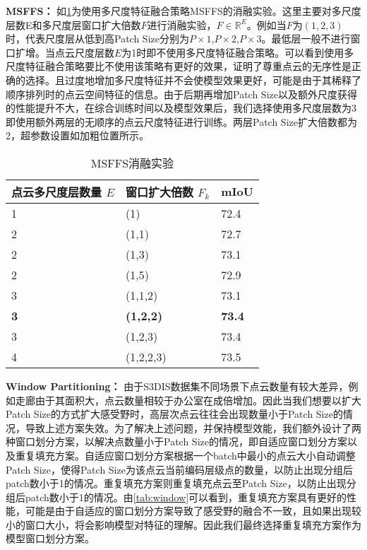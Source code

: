 \documentclass[preprint,12pt]{elsarticle}
\begin{document}
\textbf{MSFFS：}
如\cref{tab:MSFFS}为使用多尺度特征融合策略MSFFS的消融实验。这里主要对多尺度层数E和多尺度层窗口扩大倍数$F$进行消融实验，$F\in \mathbb{R}^{E}$。例如当$F$为$(1,2,3)$时，代表尺度层从低到高Patch Size分别为$P\times 1$,$P\times 2$,$P\times 3$。最低层一般不进行窗口扩增。当点云尺度层数$E$为1时即不使用多尺度特征融合策略。可以看到使用多尺度特征融合策略要比不使用该策略有更好的效果，证明了尊重点云的无序性是正确的选择。且过度地增加多尺度特征并不会使模型效果更好，可能是由于其稀释了顺序排列时的点云空间特征的信息。由于后期再增加Patch Size以及额外尺度获得的性能提升不大，在综合训练时间以及模型效果后，我们选择使用多尺度层数为3即使用额外两层的无顺序的点云尺度特征进行训练。两层Patch Size扩大倍数都为2，超参数设置如加粗位置所示。
\begin{table}[htbp!]
	\centering
	\caption{MSFFS消融实验}
	\label{tab:MSFFS}
	\begin{tabular}{@{}lll@{}}
		\toprule
		点云多尺度层数量 $E$ & 窗口扩大倍数 $F_{k}$     & mIoU          \\ \midrule
		1          & (1)              & 72.4          \\
		2          & (1,1)              & 72.7          \\
		2          & (1,3)              & 73.1          \\
		2          & (1,5)              & 72.9          \\
		3          & (1,1,2)          & 73.1          \\
		\textbf{3} & \textbf{(1,2,2)} & \textbf{73.4} \\
		3          & (1,2,3)          & 73.4          \\
		4          & (1,2,2,3)        & 73.5          \\ \bottomrule
	\end{tabular}
\end{table}


\textbf{Window Partitioning：}
由于S3DIS数据集不同场景下点云数量有较大差异，例如走廊由于其面积大，点云数量相较于办公室在成倍增加。因此当我们想要以扩大Patch Size的方式扩大感受野时，高层次点云往往会出现数量小于Patch Size的情况，导致上述方案失效。为了解决上述问题，并保持模型效能，我们额外设计了两种窗口划分方案，以解决点数量小于Patch Size的情况，即自适应窗口划分方案以及重复填充方案。自适应窗口划分方案根据一个batch中最小的点云大小自动调整Patch Size，使得Patch Size为该点云当前编码层级点的数量，以防止出现分组后patch数小于1的情况。重复填充方案则重复填充点云至Patch Size，以防止出现分组后patch数小于1的情况。由\cref{tab:window}可以看到，重复填充方案具有更好的性能，可能是由于自适应的窗口划分方案导致了感受野的融合不一致，且如果出现较小的窗口大小，将会影响模型对特征的理解。因此我们最终选择重复填充方案作为模型窗口划分方案。
\end{document}
